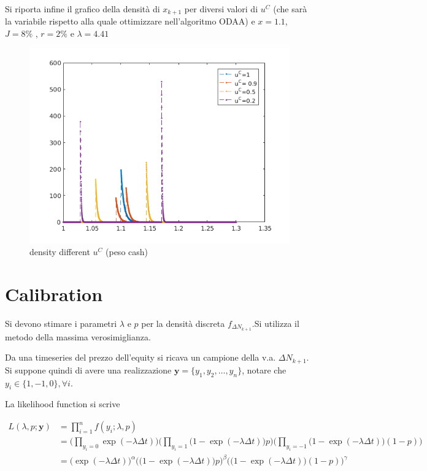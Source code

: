 \documentclass[12pt,a4paper]{article}
\theoremstyle{break}
\begin{document}
Si riporta infine il grafico della densità di $x_{k+1}$ per diversi valori di $u^C$ (che sarà la variabile rispetto alla quale ottimizzare nell'algoritmo ODAA) e $x = 1.1$, $J = 8\%$ , $r = 2\%$ e $\lambda = 4.41$
\begin{figure}[H]
	\caption{density different $u^C$ (peso cash)}
	\centering
	\includegraphics[width=\textwidth]{ptfDensity.png}
\end{figure}

\section{Calibration}
Si devono stimare i parametri $\lambda$ e $p$ per la densità discreta $f_{\Delta N_{k+1}}$.Si utilizza il metodo della massima verosimiglianza.

Da una timeseries del prezzo dell'equity si ricava un campione della v.a. $\Delta N_{k+1}$. Si suppone quindi di avere una realizzazione $\mathbf{y} = \{y_1,y_2,\ldots,y_n\}$, notare che $ y_i \in \{1,-1,0\}, \forall i$. 

La likelihood function si scrive

\begin{equation}
\begin{split}
L(\lambda,p;\mathbf{y}) & = \prod_{i=1}^{n}f(y_i;\lambda,p)\\
& =\Big(\prod_{y_i = 0}\exp(-\lambda\Delta t) \Big)
\Big(\prod_{y_i=1}\big(1-\exp(-\lambda\Delta t) \big)p \Big)
\Big(\prod_{y_i=-1}\big(1-\exp(-\lambda\Delta t)\big)(1-p) \Big)\\
& = \Big(\exp(-\lambda\Delta t) \Big)^\alpha
\Big(\big(1-\exp(-\lambda\Delta t) \big)p \Big)^\beta
\Big(\big(1-\exp(-\lambda\Delta t)\big)(1-p) \Big)^\gamma
\end{split}
\end{equation}
\end{document}

